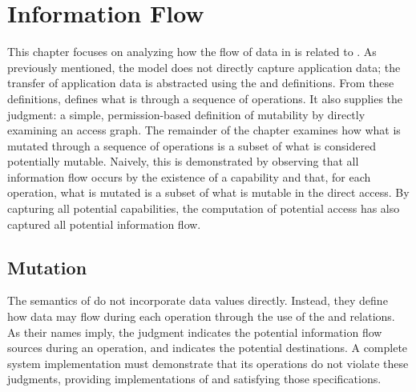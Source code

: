 \chapter{Information Flow}
\label{ch:flow}

This chapter focuses on analyzing how the flow of data in \TMmodelName{} is related to \TMpotAcc{}.
As previously mentioned, the model does not directly capture application data; the transfer of application data is abstracted using the \NMreadFrom{} and \NMwroteTo{} definitions.
From these definitions, \TMmodelName{} defines what is \term{\TMmutated{}} through a sequence of operations.
It also supplies the \term{\TMmutable{}} judgment: a simple, permission-based definition of mutability by directly examining an access graph.
The remainder of the chapter examines how what is mutated through a sequence of operations is a subset of what is considered potentially mutable.
Naively, this is demonstrated by observing that all information flow occurs by the existence of a capability and that, for each operation, what is mutated is a subset of what is mutable in the direct access.
By capturing all potential capabilities, the computation of potential access has also captured all potential information flow.

\section{Mutation}

The semantics of \TMmodelName{} do not incorporate data values directly.
Instead, they define how data may flow during each operation through the use of the \COQreadFromSpec{} and \COQwroteToSpec{} relations.
As their names imply, the \COQreadFromSpec{} judgment indicates the potential information flow sources during an operation, and \COQwroteToSpec{} indicates the potential destinations.
A complete system implementation must demonstrate that its operations do not violate these judgments, providing implementations of \COQreadFrom{} and \COQwroteTo{} satisfying those specifications.

